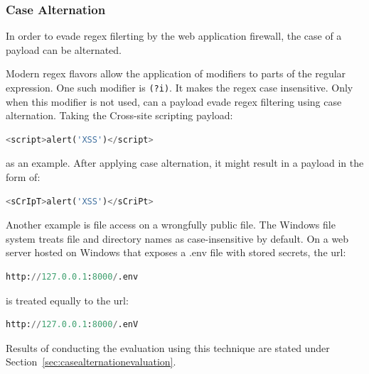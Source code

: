 \subsubsection{Case Alternation}
\label{sec:casealt}
In order to evade regex filerting by the web application firewall, the case of a payload can be alternated. \cite{medium/allypetitt}

Modern regex flavors allow the application of modifiers to parts of the regular expression.
One such modifier is \verb|(?i)|. It makes the regex case insensitive. \cite{regex/jan} Only when this modifier is not used, can a payload evade regex filtering using case alternation.
Taking the Cross-site scripting payload:

\begin{lstlisting}[style=basicStyle, language=Python]
<script>alert('XSS')</script>
\end{lstlisting}

as an example. After applying case alternation, it might result in a payload in the form of:

\begin{lstlisting}[style=basicStyle, language=Python]
<sCrIpT>alert('XSS')</sCriPt>
\end{lstlisting}

Another example is file access on a wrongfully public file.
The Windows file system treats file and directory names as case-insensitive by default. \cite{windows/casesensitive} On a web server hosted on Windows that exposes a .env file with stored secrets, the url:

\begin{lstlisting}[style=basicStyle, language=Python]
http://127.0.0.1:8000/.env
\end{lstlisting}

is treated equally to the url:

\begin{lstlisting}[style=basicStyle, language=Python]
http://127.0.0.1:8000/.enV
\end{lstlisting}

Results of conducting the evaluation using this technique are stated under Section~\ref{sec:casealternationevaluation}.




